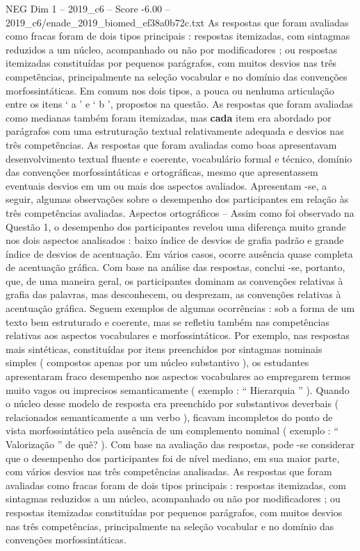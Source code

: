 \begin{textsample}{NEG Dim 1 – 2019\_c6 – Score -6.00 – 2019\_c6/enade\_2019\_biomed\_ef38a0b72c.txt}
As respostas que foram avaliadas como fracas foram de dois tipos principais : respostas itemizadas, com sintagmas reduzidos a um núcleo, acompanhado ou não por modificadores ; ou respostas itemizadas constituídas por pequenos parágrafos, com muitos desvios nas três competências, principalmente na seleção vocabular e no domínio das convenções morfossintáticas.
Em comum nos dois tipos, a pouca ou nenhuma articulação entre os itens ‘ a ’ e ‘ b ’, propostos na questão.
As respostas que foram avaliadas como medianas também foram itemizadas, mas \textbf{cada} item era abordado por parágrafos com uma estruturação textual relativamente adequada e desvios nas três competências.
As respostas que foram avaliadas como boas apresentavam desenvolvimento textual fluente e coerente, vocabulário formal e técnico, domínio das convenções morfossintáticas e ortográficas, mesmo que apresentassem eventuais desvios em um ou mais dos aspectos avaliados.
Apresentam -se, a seguir, algumas observações sobre o desempenho dos participantes em relação às três competências avaliadas.
Aspectos ortográficos – Assim como foi observado na Questão 1, o desempenho dos participantes revelou uma diferença muito grande nos dois aspectos analisados : baixo índice de desvios de grafia padrão e grande índice de desvios de acentuação.
Em vários casos, ocorre ausência quase completa de acentuação gráfica.
Com base na análise das respostas, conclui -se, portanto, que, de uma maneira geral, os participantes dominam as convenções relativas à grafia das palavras, mas desconhecem, ou desprezam, as convenções relativas à acentuação gráfica.
Seguem exemplos de algumas ocorrências : sob a forma de um texto bem estruturado e coerente, mas se refletiu também nas competências relativas aos aspectos vocabulares e morfossintáticos.
Por exemplo, nas respostas mais sintéticas, constituídas por itens preenchidos por sintagmas nominais simples ( compostos apenas por um núcleo substantivo ), os estudantes apresentaram fraco desempenho nos aspectos vocabulares ao empregarem termos muito vagos ou imprecisos semanticamente ( exemplo : “ Hierarquia ” ).
Quando o núcleo desse modelo de resposta era preenchido por substantivos deverbais ( relacionados semanticamente a um verbo ), ficavam incompletos do ponto de vista morfossintático pela ausência de um complemento nominal ( exemplo : “ Valorização ” de quê? ).
Com base na avaliação das respostas, pode -se considerar que o desempenho dos participantes foi de nível mediano, em sua maior parte, com vários desvios nas três competências analisadas.
As respostas que foram avaliadas como fracas foram de dois tipos principais : respostas itemizadas, com sintagmas reduzidos a um núcleo, acompanhado ou não por modificadores ; ou respostas itemizadas constituídas por pequenos parágrafos, com muitos desvios nas três competências, principalmente na seleção vocabular e no domínio das convenções morfossintáticas.

\end{textsample}
